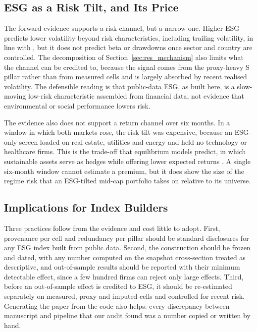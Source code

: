 \subsection{ESG as a Risk Tilt, and Its Price}

The forward evidence supports a risk channel, but a narrow one. Higher ESG
predicts lower volatility beyond \NControls risk characteristics, including
trailing volatility, in line with \cite{albuquerque_2019}, but it does not
predict beta or drawdowns once sector and country are controlled. The
decomposition of Section~\ref{sec:res_mechanism} also limits what the channel
can be credited to, because the signal comes from the proxy-heavy S pillar
rather than from measured cells and is largely absorbed by recent realised
volatility. The defensible reading is that public-data ESG, as built here,
is a slow-moving low-risk characteristic assembled from financial data, not
evidence that environmental or social performance lowers risk.

The evidence also does not support a return channel over six months. In a
window in which both markets rose, the risk tilt was expensive, because an
ESG-only screen loaded on real estate, utilities and energy and held no
technology or healthcare firms. This is the trade-off that equilibrium models
predict, in which sustainable assets serve as hedges while offering lower
expected returns \cite{pastor_2021, pedersen_2021}. A single six-month window
cannot estimate a premium, but it does show the size of the regime risk that
an ESG-tilted mid-cap portfolio takes on relative to its universe.

\subsection{Implications for Index Builders}

Three practices follow from the evidence and cost little to adopt. First,
provenance per cell and redundancy per pillar should be standard disclosures
for any ESG index built from public data. Second, the construction should be
frozen and dated, with any number computed on the snapshot cross-section
treated as descriptive, and out-of-sample results should be reported with
their minimum detectable effect, since a few hundred firms can reject only
large effects. Third, before an out-of-sample effect is credited to ESG, it
should be re-estimated separately on measured, proxy and imputed cells and
controlled for recent risk. Generating the paper from the code also helps:
every discrepancy between manuscript and pipeline that our audit found was a
number copied or written by hand.
